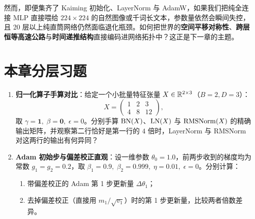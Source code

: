 然而，即便集齐了 Kaiming 初始化、LayerNorm 与 AdamW，如果我们把纯全连接 MLP 直接喂给 $224 \times 224$ 的自然图像或千词长文本，参数量依然会瞬间失控，且 20 层以上纯直筒网络仍然面临退化瓶颈。如何把世界的\textbf{空间平移对称性}、\textbf{跨层恒等高速公路}与\textbf{时间递推结构}直接编码进网络拓扑中？这正是下一章的主题。

\section*{本章分层习题}


\begin{enumerate}
  \item[\textbf{5.2.1}] \textbf{归一化算子手算对比}：给定一个小批量特征张量 $X \in \mathbb{R}^{2 \times 3}$（$B=2, D=3$）：
  \[
    X = \begin{pmatrix} 1 & 2 & 3 \\ 4 & 8 & 12 \end{pmatrix},
  \]
  取 $\gamma = \mathbf{1},\; \beta = \mathbf{0},\; \epsilon = 0$。分别手算 $\operatorname{BN}(X)$、$\operatorname{LN}(X)$ 与 $\operatorname{RMSNorm}(X)$ 的精确输出矩阵，并观察第二行恰好是第一行的 $4$ 倍时，LayerNorm 与 RMSNorm 对这两行的输出有何异同？

  \item[\textbf{5.2.2}] \textbf{Adam 初始步与偏差校正直观}：设一维参数 $\theta_0 = 1.0$，前两步收到的梯度均为常数 $g_1 = g_2 = 0.2$，取 $\beta_1 = 0.9,\; \beta_2 = 0.999,\; \eta = 0.01,\; \epsilon = 0$。分别计算：
  \begin{enumerate}
    \item 带偏差校正的 Adam 第 1 步更新量 $\Delta \theta_1$；
    \item 去掉偏差校正（直接用 $m_1/\sqrt{v_1}$）时的第 1 步更新量，比较两者倍数差异。
  \end{enumerate}
\end{enumerate}


